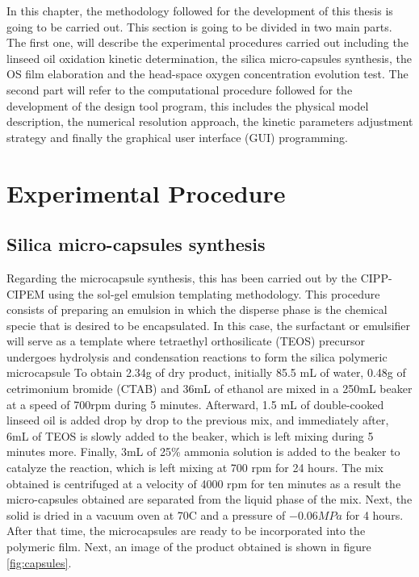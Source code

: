 \begin{refsection}
In this chapter, the methodology followed for the development of this thesis is going to be carried out. This section is going to be divided in two main parts. The first one, will describe the experimental procedures carried out including the linseed oil oxidation kinetic determination, the silica micro-capsules synthesis, the OS film elaboration and the head-space oxygen concentration evolution test. The second part will refer to the computational procedure followed for the development of the design tool program, this includes the physical model description, the numerical resolution approach, the kinetic parameters adjustment strategy and finally the graphical user interface (GUI) programming. 

\section{Experimental Procedure}
\subsection{Silica micro-capsules synthesis}
Regarding the microcapsule synthesis, this has been carried out by the CIPP-CIPEM using the sol-gel emulsion templating methodology. This procedure consists of preparing an emulsion in which the disperse phase is the chemical specie that is desired to be encapsulated. In this case, the surfactant or emulsifier will serve as a template where tetraethyl orthosilicate (TEOS) precursor undergoes hydrolysis and condensation reactions to form the silica polymeric microcapsule \cites{GonzalezPungo2018EvaluacionActivos, GomezAlfonzo2018AceiteOxigeno} To obtain 2.34g of dry product, initially 85.5 mL of water, 0.48g of cetrimonium bromide (CTAB) and 36mL of ethanol are mixed in a 250mL beaker at a speed of 700rpm during 5 minutes. Afterward, 1.5 mL of double-cooked linseed oil is added drop by drop to the previous mix, and immediately after, 6mL of TEOS is slowly added to the beaker, which is left mixing during 5 minutes more. Finally, 3mL of 25\% ammonia solution is added to the beaker to catalyze the reaction, which is left mixing at 700 rpm for 24 hours. The mix obtained is centrifuged at a velocity of 4000 rpm for ten minutes as a result the micro-capsules obtained are separated from the liquid phase of the mix. Next, the solid is dried in a vacuum oven at 70\degree C and a pressure of $-0.06 MPa$ for 4 hours. After that time, the microcapsules are ready to be incorporated into the polymeric film. Next, an image of the product obtained is shown in figure \ref{fig:capsules}. 










\end{refsection}